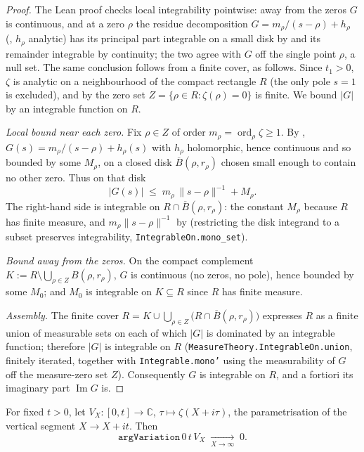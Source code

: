 \begin{proof}
\leanok
{}
The Lean proof checks local integrability pointwise: away from the zeros $G$ is continuous, and at
a zero $\rho$ the residue decomposition $G=m_\rho/(s-\rho)+h_\rho$
(, $h_\rho$ analytic) has its principal part integrable on a small
disk by  and its remainder integrable by continuity; the two agree with
$G$ off the single point $\rho$, a null set. The same conclusion follows from a finite cover,
as follows.
Since $t_1>0$, $\zeta$ is analytic on a neighbourhood of the compact rectangle
$R$ (the only pole $s=1$ is excluded), and by  the
zero set $Z=\{\rho\in R:\zeta(\rho)=0\}$ is finite. We bound $\lvert G\rvert$ by an
integrable function on $R$.

\emph{Local bound near each zero.} Fix $\rho\in Z$ of order
$m_\rho=\operatorname{ord}_\rho\zeta\ge1$. By ,
$G(s)=m_\rho/(s-\rho)+h_\rho(s)$ with $h_\rho$ holomorphic, hence continuous and so
bounded by some $M_\rho$, on a closed disk $\overline{B}(\rho,r_\rho)$ chosen small
enough to contain no other zero. Thus on that disk
\[
  \lvert G(s)\rvert\;\le\; m_\rho\,\lVert s-\rho\rVert^{-1}+M_\rho .
\]
The right-hand side is integrable on $R\cap\overline{B}(\rho,r_\rho)$: the constant
$M_\rho$ because $R$ has finite measure, and $m_\rho\lVert s-\rho\rVert^{-1}$ by
 (restricting the disk integrand to a subset preserves
integrability, \texttt{IntegrableOn.mono\_set}).

\emph{Bound away from the zeros.} On the compact complement
$K:=R\setminus\bigcup_{\rho\in Z}B(\rho,r_\rho)$, $G$ is continuous (no zeros, no
pole), hence bounded by some $M_0$; and $M_0$ is integrable on $K\subseteq R$ since
$R$ has finite measure.

\emph{Assembly.} The finite cover $R=K\cup\bigcup_{\rho\in Z}\bigl(R\cap
\overline{B}(\rho,r_\rho)\bigr)$ expresses $R$ as a finite union of measurable sets
on each of which $\lvert G\rvert$ is dominated by an integrable function; therefore
$\lvert G\rvert$ is integrable on $R$
(\texttt{MeasureTheory.IntegrableOn.union}, finitely iterated, together with
\texttt{Integrable.mono'} using the measurability of $G$ off the measure-zero set
$Z$). Consequently $G$ is integrable on $R$, and a fortiori its imaginary part
$\operatorname{Im}G$ is.
\end{proof}

\begin{lemma}
\label{lem:lb_argVar_vertical}
\leanok
{}
For fixed $t>0$, let $V_X:[0,t]\to\mathbb{C}$, $\tau\mapsto\zeta(X+i\tau)$, the
parametrisation of the vertical segment $X\to X+it$. Then
\[
  \texttt{argVariation}\,0\,t\,V_X \;\xrightarrow[X\to\infty]{}\; 0 .
\]
\end{lemma}

